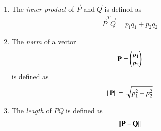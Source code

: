 \renewcommand{\theequation}{\theenumi}

\begin{enumerate}[label=\arabic*.,ref=\thesubsection.\theenumi]

\item The {\em inner product} of  $\vec{P}$ and $\vec{Q}$ is defined as
\begin{align}
\vec{P}^T\vec{Q} = p_1q_1+p_2q_2
\end{align}
\item The {\em norm} of a vector 
\begin{align}
\mathbf{P} = \begin{pmatrix}p_1\\p_2\end{pmatrix}
\end{align}
is defined as
\begin{align}
\left\lVert\mathbf{P}\right\rVert = \sqrt{p_1^2+p_2^2}
\end{align}
\item The {\em length} of $PQ$ is defined as
\begin{align}
\left\lVert\mathbf{P}-\mathbf{Q}\right\rVert
\end{align}



\end{enumerate}
